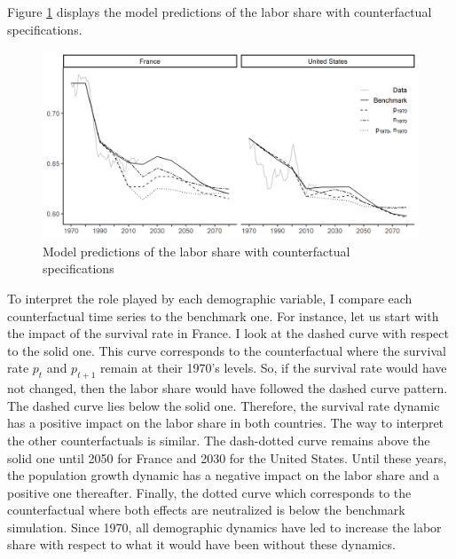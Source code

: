 Figure \ref{fig:counter_PGSR} displays the model predictions of the labor share with counterfactual specifications.
\begin{figure}[tb]
	\centering
	\caption{Model predictions of the labor share with counterfactual specifications}\label{fig:counter_PGSR}
	\includegraphics[width=1\linewidth]{../result/decomposition/counter_PGSR.png}
\end{figure}
To interpret the role played by each demographic variable, I compare each counterfactual time series to the benchmark one. For instance, let us start with the impact of the survival rate in France. I look at the dashed curve with respect to the solid one. This curve corresponds to the counterfactual where the survival rate $p_t$ and $p_{t+1}$ remain at their 1970's levels. So, if the survival rate would have not changed, then the labor share would have followed the dashed curve pattern. 
The dashed curve lies below the solid one. Therefore, the survival rate dynamic has a positive impact on the labor share in both countries.
The way to interpret the other counterfactuals is similar.
The dash-dotted curve remains above the solid one until 2050 for France and 2030 for the United States. Until these years, the population growth dynamic has a negative impact on the labor share and a positive one thereafter.
Finally, the dotted curve which corresponds to the counterfactual where both effects are neutralized is below the benchmark simulation. Since 1970, all demographic dynamics have led to increase the labor share with respect to what it would have been without these dynamics.
